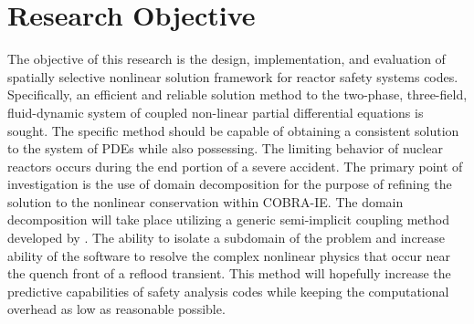 \section{Research Objective}
The objective of this research is the design, implementation, and evaluation of spatially selective nonlinear solution framework for reactor safety systems codes.
Specifically, an efficient and reliable solution method to the two-phase, three-field, fluid-dynamic system of coupled non-linear partial differential equations is sought.
The specific method should be capable of obtaining a consistent solution to the system of PDEs while also possessing.
\cite{Aktas1996}
The limiting behavior of nuclear reactors occurs during the end portion of a severe accident.
The primary point of investigation is the use of domain decomposition for the purpose of refining the solution to the nonlinear conservation within COBRA-IE.
The domain decomposition will take place utilizing a generic semi-implicit coupling method developed by \citet{Weaver2002}.
The ability to isolate a subdomain of the problem and increase ability of the software to resolve the complex nonlinear physics that occur near the quench front of a reflood transient.
This method will hopefully increase the predictive capabilities of safety analysis codes while keeping the computational overhead as low as reasonable possible.